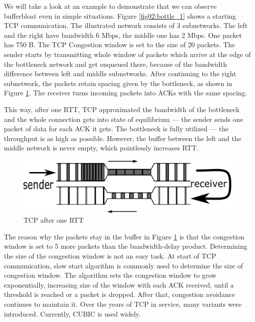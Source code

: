 We will take a look at an example to demonstrate that we can observe bufferbloat even in simple situations. Figure \ref{fig02:bottle_1} shows a starting TCP communication. The illustrated network consists of 3 subnetworks. The left and the right have bandwidth 6 Mbps, the middle one has 2 Mbps. One packet has 750 B. The TCP Congestion window is set to the size of 20 packets. The sender starts by transmitting whole window of packets which arrive at the edge of the bottleneck network and get enqueued there, because of the bandwidth difference between left and middle subnetworks. After continuing to the right subnetwork, the packets retain spacing given by the bottleneck, as shown in Figure \ref{fig03:bottle_2}. The receiver turns incoming packets into ACKs with the same spacing. 

This way, after one RTT, TCP approximated the bandwidth of the bottleneck and the whole connection gets into state of equilibrium --- the sender sends one packet of data for each ACK it gets. The bottleneck is fully utilized --- the throughput is as high as possible. However, the buffer between the left and the middle network is never empty, which pointlessly increases RTT.

\begin{figure}
	\centering
	\includegraphics[width=.8\linewidth]{drawings/tcp_bottleneck_2}
	\caption{TCP after one RTT}
	
	\label{fig03:bottle_2}
\end{figure}

The reason why the packets stay in the buffer in Figure \ref{fig03:bottle_2} is that the congestion window is set to 5 more packets than the bandwidth-delay product. Determining the size of the congestion window is not an easy task. At start of TCP communication, slow start algorithm \cite{Jacobson:1988:CAC:52324.52356} is commonly used to determine the size of congestion window. The algorithm sets the congestion window to grow exponentially, increasing size of the window with each ACK received, until a threshold is reached or a packet is dropped. After that, congestion avoidance continues to maintain it. Over the years of TCP in service, many variants were introduced. Currently, CUBIC \cite{CUBIC} is used widely. 

